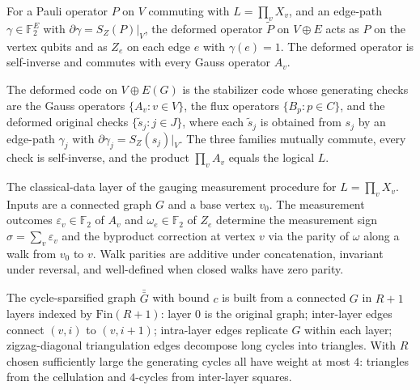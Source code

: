 \begin{definition}
\label{def:3_deformed_operator}
\leanok
For a Pauli operator $P$ on $V$ commuting with $L = \prod_v X_v$, and an edge-path
$\gamma \in \mathbb{F}_2^E$ with $\partial \gamma = S_Z(P)|_V$, the deformed operator
$\tilde P$ on $V \oplus E$ acts as $P$ on the vertex qubits and as $Z_e$ on each edge
$e$ with $\gamma(e) = 1$. The deformed operator is self-inverse and commutes with every
Gauss operator $A_v$.
\end{definition}

\begin{definition}
\label{def:4_deformed_code}
\leanok
The deformed code on $V \oplus E(G)$ is the stabilizer code whose generating checks are the
Gauss operators $\{A_v : v \in V\}$, the flux operators $\{B_p : p \in C\}$, and the deformed
original checks $\{\tilde s_j : j \in J\}$, where each $\tilde s_j$ is obtained from $s_j$
by an edge-path $\gamma_j$ with $\partial \gamma_j = S_Z(s_j)|_V$. The three families
mutually commute, every check is self-inverse, and the product $\prod_v A_v$ equals the
logical $L$.
\end{definition}

\begin{definition}
\label{def:5_gauging_measurement_algorithm}
\leanok
The classical-data layer of the gauging measurement procedure for $L = \prod_v X_v$. Inputs
are a connected graph $G$ and a base vertex $v_0$. The measurement outcomes
$\varepsilon_v \in \mathbb{F}_2$ of $A_v$ and $\omega_e \in \mathbb{F}_2$ of $Z_e$ determine
the measurement sign $\sigma = \sum_v \varepsilon_v$ and the byproduct correction at vertex
$v$ via the parity of $\omega$ along a walk from $v_0$ to $v$. Walk parities are additive
under concatenation, invariant under reversal, and well-defined when closed walks have zero
parity.
\end{definition}

\begin{definition}
\label{def:6_cycle_sparsified_graph}
\leanok
The cycle-sparsified graph $\bar{\bar G}$ with bound $c$ is built from a connected $G$ in
$R+1$ layers indexed by $\mathrm{Fin}(R+1)$: layer $0$ is the original graph; inter-layer
edges connect $(v, i)$ to $(v, i+1)$; intra-layer edges replicate $G$ within each layer;
zigzag-diagonal triangulation edges decompose long cycles into triangles. With $R$ chosen
sufficiently large the generating cycles all have weight at most $4$: triangles from the
cellulation and $4$-cycles from inter-layer squares.
\end{definition}


